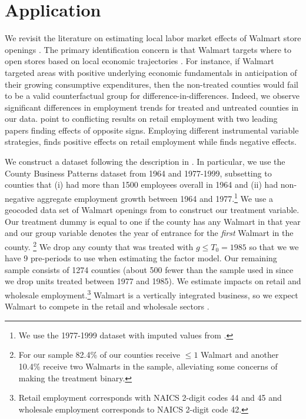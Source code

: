 \documentclass[12pt]{article}
\begin{document}
\section{Application}\label{sec:application}

We revisit the literature on estimating local labor market effects of Walmart store openings \citep{basker2005job, neumark2008effects, volpe2022economic}. The primary identification concern is that Walmart targets where to open stores based on local economic trajectories \citep{neumark2008effects}. For instance, if Walmart targeted areas with positive underlying economic fundamentals in anticipation of their growing consumptive expenditures, then the non-treated counties would fail to be a valid counterfactual group for difference-in-differences. Indeed, we observe significant differences in employment trends for treated and untreated counties in our data. \citet{volpe2022economic} point to conflicting results on retail employment with two leading papers finding effects of opposite signs. Employing different instrumental variable strategies, \citet{basker2005job} finds positive effects on retail employment while \citet{neumark2008effects} finds negative effects.

We construct a dataset following the description in \citet{basker2005job}. In particular, we use the County Business Patterns dataset from 1964 and 1977-1999, subsetting to counties that (i) had more than 1500 employees overall in 1964 and (ii) had non-negative aggregate employment growth between 1964 and 1977.\footnote{We use the 1977-1999 dataset with imputed values from \citet{eckert2021imputing}.} We use a geocoded data set of Walmart openings from \citet{arcidiacono2020competitive} to construct our treatment variable. Our treatment dummy is equal to one if the county has any Walmart in that year and our group variable denotes the year of entrance for the \emph{first} Walmart in the county. \footnote{For our sample 82.4\% of our counties receive $\leq 1$ Walmart and another 10.4\% receive two Walmarts in the sample, alleviating some concerns of making the treatment binary.} We drop any county that was treated with $g \leq T_0 = 1985$ so that we we have 9 pre-periods to use when estimating the factor model. Our remaining sample consists of 1274 counties (about 500 fewer than the sample used in \citet{basker2005job} since we drop units treated between 1977 and 1985). We estimate impacts on retail and wholesale employment.\footnote{Retail employment corresponds with NAICS 2-digit codes 44 and 45 and wholesale employment corresponds to NAICS 2-digit code 42.} Walmart is a vertically integrated business, so we expect Walmart to compete in the retail and wholesale sectors \citep{basker2005job}.
\end{document}
